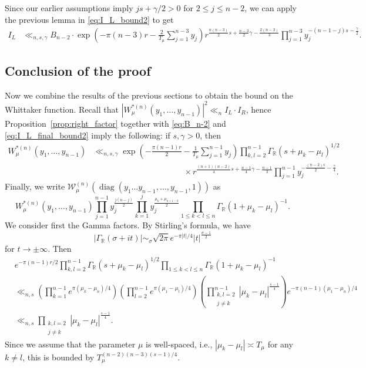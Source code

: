 \documentclass[11pt, oneside]{amsart}
\theoremstyle{plain}
\theoremstyle{remark}
\newcommand{\R}{\mathbb{R}}
\newcommand{\abs}[1]{\left|#1\right|}
\DeclareMathOperator{\diag}{diag}
\begin{document}
Since our earlier 
assumptions imply $js+\gamma/2>0$ for $2\leq j\leq n-2$, we can
apply the
previous lemma
in \eqref{eq:I_L_bound2} to get
\begin{align}\label{eq:I_L_final_bound2}
I_L&\ll_{n,s,\gamma} B_{n-2}\cdot 
\exp\left(-\pi (n-3)r-\frac{2}{T_\mu}\sum_{j=1}^{n-3} y_j\right)
    r^{\frac{n(n-3)}{2}s+\frac {n-3}{2}\gamma-\frac{2(n-3)}{3}}
    \prod_{j=1}^{n-3}y_j^{-(n-1-j)s-\frac{\gamma}{2}}.
\end{align}

\subsection{Conclusion of the proof}\label{sec:conclusion_of_the_proof}
Now we combine the results of the previous sections to obtain the
bound on the Whittaker function. Recall that
$\abs{W_\mu^{\ast(n)}(y_1,\dots,y_{n-1})}^2\ll_n I_L\cdot I_R$,
hence Proposition~\ref{prop:right_factor} together with \eqref{eq:B_n-2}
and \eqref{eq:I_L_final_bound2} imply the following: if 
$s,\gamma>0$, then
\begin{align*}
    W_\mu^{\ast(n)}(y_1,\dots,y_{n-1})
    &\ll_{n,s,\gamma}\exp\left(-\frac{\pi (n-1)r}{2}-\frac{1}{T_\mu}\sum_{j=1}^{n-1} y_j\right)
\prod_{k,l=2}^{n-1}\Gamma_\R(s+\mu_k-\mu_l)^{1/2}\\
    &\qquad\qquad\qquad\qquad\qquad\quad\times
    r^{\frac{(n+1)(n-2)}{4}s+\frac {n-1}{4}\gamma-\frac{n-1}{3}}
    \prod_{j=1}^{n-1}y_j^{-\frac{(n-2)s}{2}-\frac{\gamma}{4}}.
\end{align*}
Finally, we write $\mathcal W_\mu^{(n)}(\diag(y_1\dots y_{n-1},\dots,y_{n-1},1))$ as
\[
W_\mu^{\ast(n)}(y_1,\dots,y_{n-1})\prod_{j=1}^{n-1}y_j^{\frac{j(n-j)}2}\prod_{k=1}^jy_j^{\frac{\mu_k+\mu_{n+1-k}}{2}}\prod_{1\leq k<l\leq n}\Gamma_\R(1+\mu_k-\mu_l)^{-1}.
\]
We consider first the Gamma factors. By Stirling's formula, we have
$$\abs{\Gamma_\R(\sigma+it)}\sim_\sigma\sqrt{2\pi}e^{-\pi\abs t/4}\abs t^{\frac{\sigma-1}2}$$
for $t\to\pm\infty$. Then
\begin{align*}
&e^{-\pi(n-1)r/2}\prod_{k,l=2}^{n-1}\Gamma_\R(s+\mu_k-\mu_l)^{1/2}\prod_{1\leq k<l\leq n}\Gamma_\R(1+\mu_k-\mu_l)^{-1}\\
    &\ll_{n,s}\left(\prod_{k=1}^{n-1}e^{\pi(\mu_k-\mu_n)/4}\right)\left(\prod_{l=2}^{n-1}e^{\pi(\mu_1-\mu_l)/4}\right)\left(\prod_{\substack{k,l=2\\j\neq k}}^{n-1}\abs{\mu_k-\mu_l}^{\frac{s-1}4}\right)e^{-\pi(n-1)(\mu_1-\mu_n)/4}\\
    &\ll_{n,s}
    \prod_{\substack{k,l=2\\j\neq k} }\abs{\mu_k-\mu_l}^{\frac{s-1}4}.
\end{align*}
Since we assume that the parameter $\mu$ is well-spaced, i.e., $\abs{\mu_k-\mu_l}\asymp T_\mu$
for any $k\neq l$,
this is bounded by $T_\mu^{(n-2)(n-3)(s-1)/4}$. 
\end{document}
